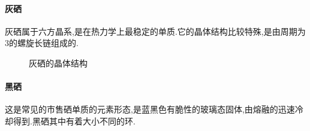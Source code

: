\documentclass{ctexart}
\begin{document}
\paragraph{灰硒}
灰硒属于六方晶系,是在热力学上最稳定的单质.它的晶体结构比较特殊,是由周期为$3$的螺旋长链组成的.
\begin{figure}[H]
    \centering
    \caption{灰硒的晶体结构}
\end{figure}
\paragraph{黑硒} 这是常见的市售硒单质的元素形态,是蓝黑色有脆性的玻璃态固体,由熔融的迅速冷却得到.黑硒其中有着大小不同的环.
\end{document}
